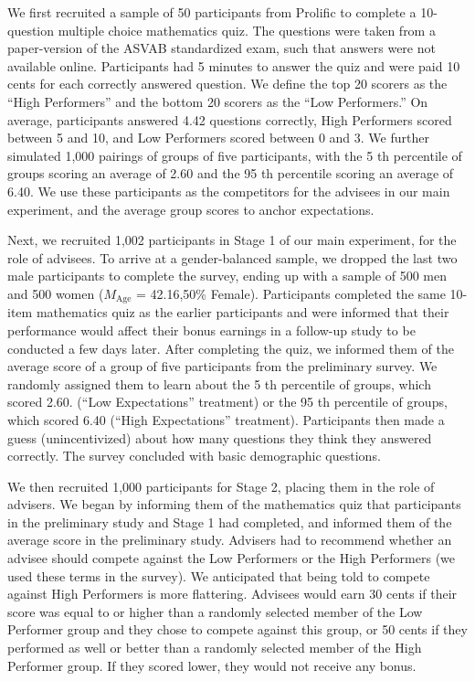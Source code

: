 \documentclass[
  man,floatsintext]{apa6}
\begin{document}
We first recruited a sample of 50 participants from Prolific to complete a 10-question multiple choice mathematics quiz. The questions were taken from a paper-version of the ASVAB standardized exam, such that answers were not available online. Participants had 5 minutes to answer the quiz and were paid 10 cents for each correctly answered question. We define the top 20 scorers as the ``High Performers'' and the bottom 20 scorers as the ``Low Performers.'' On average, participants answered 4.42 questions correctly, High Performers scored between 5 and 10, and Low Performers scored between 0 and 3. We further simulated 1,000 pairings of groups of five participants, with the 5 th percentile of groups scoring an average of 2.60 and the 95 th percentile scoring an average of 6.40. We use these participants as the competitors for the advisees in our main experiment, and the average group scores to anchor expectations.

Next, we recruited 1,002 participants in Stage 1 of our main experiment, for the role of advisees. To arrive at a gender-balanced sample, we dropped the last two male participants to complete the survey, ending up with a sample of 500 men and 500 women (\(M_{\text{Age}}\) = 42.16,50\% Female). Participants completed the same 10-item mathematics quiz as the earlier participants and were informed that their performance would affect their bonus earnings in a follow-up study to be conducted a few days later. After completing the quiz, we informed them of the average score of a group of five participants from the preliminary survey. We randomly assigned them to learn about the 5 th percentile of groups, which scored 2.60. (``Low Expectations'' treatment) or the 95 th percentile of groups, which scored 6.40 (``High Expectations'' treatment). Participants then made a guess (unincentivized) about how many questions they think they answered correctly. The survey concluded with basic demographic questions.

We then recruited 1,000 participants for Stage 2, placing them in the role of advisers. We began by informing them of the mathematics quiz that participants in the preliminary study and Stage 1 had completed, and informed them of the average score in the preliminary study. Advisers had to recommend whether an advisee should compete against the Low Performers or the High Performers (we used these terms in the survey). We anticipated that being told to compete against High Performers is more flattering. Advisees would earn 30 cents if their score was equal to or higher than a randomly selected member of the Low Performer group and they chose to compete against this group, or 50 cents if they performed as well or better than a randomly selected member of the High Performer group. If they scored lower, they would not receive any bonus.
\end{document}
